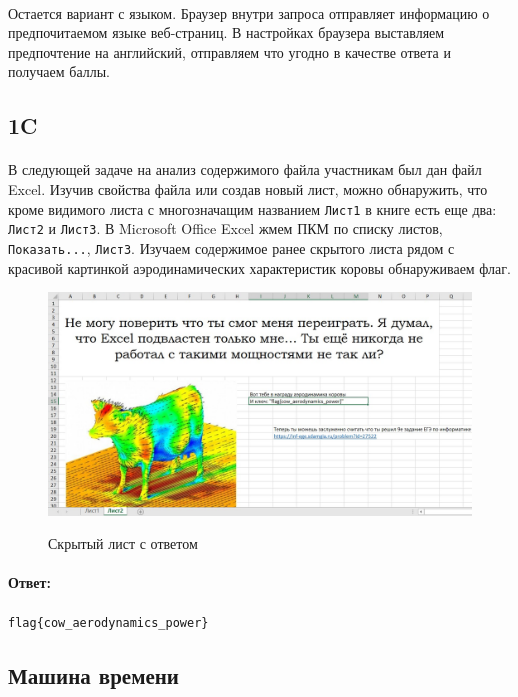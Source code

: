 \documentclass[12pt]{article}
\begin{document}
    \paragraph{}
	Остается вариант с языком.
	Браузер внутри запроса отправляет информацию о предпочитаемом языке веб-страниц.
	В настройках браузера выставляем предпочтение на английский, отправляем что угодно в качестве ответа и получаем баллы.

    \subsection{1C}
	\paragraph{}
    В следующей задаче на анализ содержимого файла участникам был дан файл Excel.
	Изучив свойства файла или создав новый лист, можно обнаружить,
	что кроме видимого листа с многозначащим названием \verb|Лист1| в книге есть еще два: \verb|Лист2| и \verb|Лист3|.
	В Microsoft Office Excel жмем ПКМ по списку листов, \verb|Показать...|, \verb|Лист3|.
	Изучаем содержимое ранее скрытого листа рядом с красивой картинкой аэродинамических характеристик коровы
	обнаруживаем флаг.
    \begin{figure}[H]
        \centering
        \includegraphics[width=12cm]{task11}
        \label{fig:task11}
        \caption{Скрытый лист с ответом}
    \end{figure}
    \paragraph{Ответ:}
    \verb|flag{cow_aerodynamics_power}|

    \subsection{Машина времени}
\end{document}
